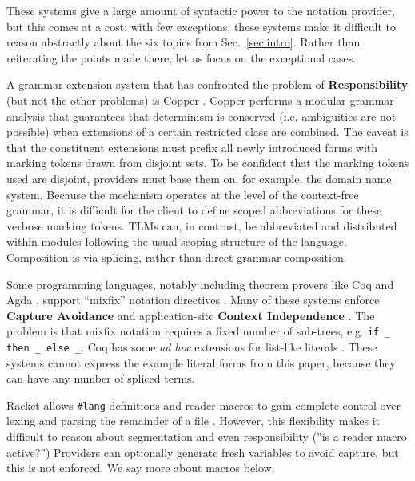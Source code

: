 \documentclass[acmsmall]{acmart}
\newcommand{\li}[1]{\lstinline[basicstyle=\ttfamily\fontsize{9pt}{1em}\selectfont]{#1}}
\begin{document}
These systems give a large amount of syntactic power to the notation provider, but this comes at a cost: with few exceptions, these systems make it difficult to reason abstractly about the six topics from Sec.~\ref{sec:intro}. Rather than reiterating the points made there, let us focus on the exceptional cases.

A grammar extension system that has confronted the problem of \textbf{Responsibility} (but not the other problems) is Copper \cite{conf/pldi/SchwerdfegerW09,schwerdfeger2010context}. Copper performs a modular grammar analysis that guarantees that determinism is conserved (i.e. ambiguities are not possible) when extensions of a certain restricted class are combined. The caveat is that the constituent extensions must prefix all newly introduced forms with marking tokens drawn from disjoint sets. To be confident that the marking tokens used are disjoint, providers must base them on, for example, the domain name system. Because the mechanism operates at the level of the context-free grammar, it is difficult for the client to define scoped abbreviations for these verbose marking tokens. TLMs can, in contrast, be abbreviated and distributed within modules following the usual scoping structure of the language. Composition is via splicing, rather than direct grammar composition.

Some programming languages, notably including theorem provers like Coq \cite{Coq:manual} and Agda \cite{norell2007towards}, support ``mixfix'' notation directives \cite{wieland2009parsing,missura1997higher,5134}. Many of these systems enforce \textbf{Capture Avoidance} and application-site \textbf{Context Independence} \cite{5134,DBLP:conf/gpce/TahaJ03,Coq:manual,DBLP:conf/ifl/DanielssonN08}. The problem is that mixfix notation requires a fixed number of sub-trees, e.g. \li{if _ then _ else _}. Coq has some \emph{ad hoc} extensions for list-like literals \cite{Coq:manual}. These systems cannot express the example literal forms from this paper, because they can have any number of spliced terms.

Racket allows \li{#lang} definitions and reader macros to gain complete control over lexing and parsing the remainder of a file \cite{Flatt:2012:CLR:2063176.2063195}. However, this flexibility makes it difficult to reason about segmentation and even responsibility (''is a reader macro active?'') Providers can optionally generate fresh variables to avoid capture, but this is not enforced. We say more about macros below.
\end{document}
